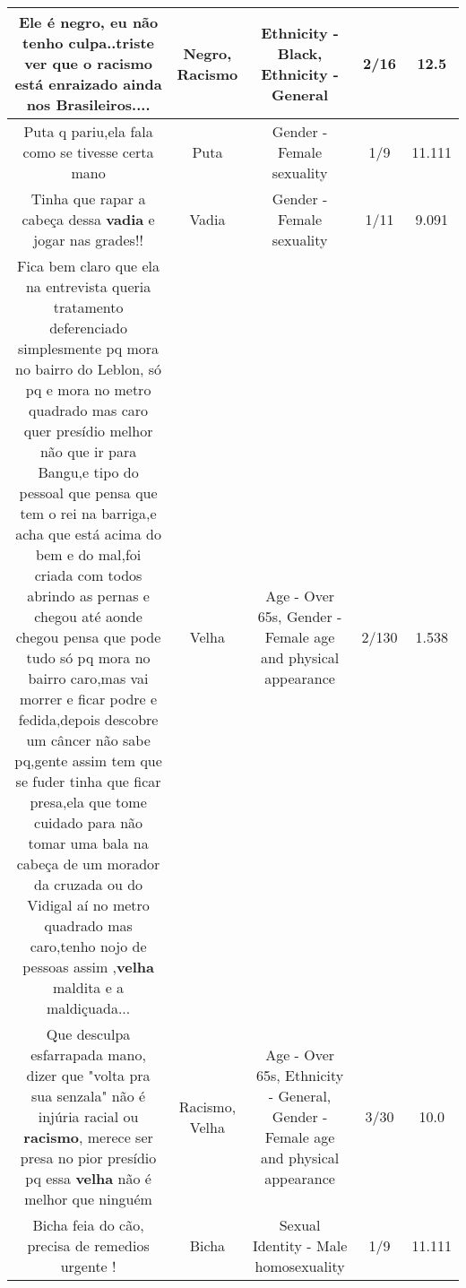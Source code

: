 \documentclass[11pt]{article}
\newlength\mylength
\begin{document}
\begin{center}
\begin{longtable}{|C{.65\mylength}|C{.30\mylength}|C{.12\mylength}|C{.12\mylength}|C{.12\mylength}|}
  \small Ele é \textbf{negro}, eu não tenho culpa..triste ver que o \textbf{racismo} está enraizado ainda nos Brasileiros....\normalsize   & Negro, Racismo & Ethnicity - Black, Ethnicity - General & 2/16 & 12.5 \\  \hline
  \small Puta q pariu,ela fala como se tivesse certa mano\normalsize   & Puta & Gender - Female sexuality & 1/9 & 11.111 \\  \hline
  \small Tinha que rapar a cabeça dessa \textbf{vadia} e jogar nas grades!!\normalsize   & Vadia & Gender - Female sexuality & 1/11 & 9.091 \\  \hline
  \small Fica bem claro que ela na entrevista queria tratamento deferenciado simplesmente pq mora no bairro do Leblon, só pq e mora no metro quadrado mas caro quer presídio melhor não que ir para Bangu,e tipo do pessoal que pensa que tem o rei na barriga,e acha que está acima do bem e do mal,foi criada com todos abrindo as pernas e chegou até aonde chegou pensa que pode tudo só pq mora no bairro caro,mas vai morrer e ficar podre e fedida,depois descobre um câncer não sabe pq,gente assim tem que se fuder tinha que ficar presa,ela que tome cuidado para não tomar uma bala na cabeça de um morador da cruzada ou do Vidigal aí no metro quadrado mas caro,tenho nojo de pessoas assim ,\textbf{v\textbf{elha}} maldita e a maldiçuada...\normalsize   & Velha & Age - Over 65s, Gender - Female age and physical appearance & 2/130 & 1.538 \\  \hline
  \small Que desculpa esfarrapada mano, dizer que "volta pra sua senzala" não é injúria racial ou \textbf{racismo}, merece ser presa no pior presídio pq essa \textbf{v\textbf{elha}} não é melhor que ninguém\normalsize   & Racismo, Velha & Age - Over 65s, Ethnicity - General, Gender - Female age and physical appearance & 3/30 & 10.0 \\  \hline
  \small Bicha feia do cão,  precisa de remedios urgente !\normalsize   & Bicha & Sexual Identity - Male homosexuality & 1/9 & 11.111 \\  \hline

\end{longtable}
\end{center}
\end{document}

